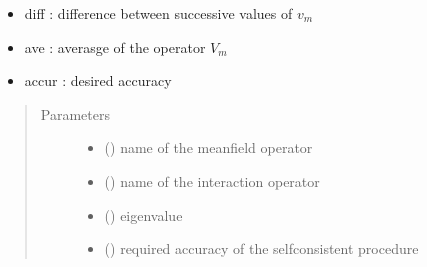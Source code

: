 \documentclass[letterpaper,10pt,english]{sphinxmanual}
\begin{document}
\begin{fulllineitems}
\begin{description}
\begin{itemize}
\item {} 
\sphinxAtStartPar
diff : difference between successive values of \(v_m\)

\item {} 
\sphinxAtStartPar
ave : averasge of the operator \(V_m\)

\item {} 
\sphinxAtStartPar
accur : desired accuracy

\end{itemize}

\end{description}

\begin{fulllineitems}
\label{\detokenize{utilities:pyqcm.hartree.hartree.__init__}}\begin{quote}\begin{description}
\item[{Parameters}] \leavevmode\begin{itemize}
\item {} 
\sphinxAtStartPar
{} () \textendash{} name of the mean\sphinxhyphen{}field operator

\item {} 
\sphinxAtStartPar
{} () \textendash{} name of the interaction operator

\item {} 
\sphinxAtStartPar
{} () \textendash{} eigenvalue

\item {} 
\sphinxAtStartPar
{} () \textendash{} required accuracy of the self\sphinxhyphen{}consistent procedure


\end{itemize}
\end{description}
\end{quote}
\end{fulllineitems}
\end{fulllineitems}
\end{document}
